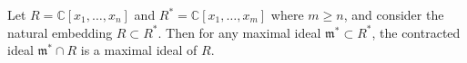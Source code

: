 Let $R = \mathbb{C}[x_1, \ldots, x_n]$ and $R^* = \mathbb{C}[x_1, \ldots, x_m]$ where $m \geqslant n$, and consider the natural embedding $R \subset R^*$. Then for any maximal ideal $\mathfrak{m}^* \subset R^*$, the contracted ideal $\mathfrak{m}^* \cap R$ is a maximal ideal of $R$.
